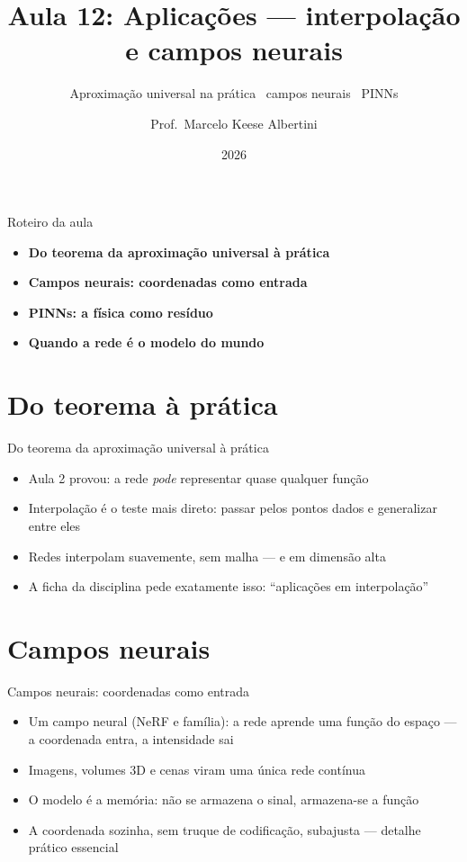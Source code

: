 \documentclass[aspectratio=169, 11pt]{beamer}
\title[Aula 12 — Interpolação]{Aula 12: Aplicações — interpolação e campos neurais}
\subtitle[GBC073 — Inteligência Computacional]{Aproximação universal na prática \textbullet\ campos neurais \textbullet\ PINNs}
\author[Prof.\ Marcelo Albertini]{Prof.\ Marcelo Keese Albertini}
\institute{GBC073 — Inteligência Computacional \textbullet\ Universidade Federal de Uberlândia}
\date{2026}
\begin{document}
\begin{frame}
  \titlepage
\end{frame}

\begin{frame}{Roteiro da aula}
  \begin{itemize}\setlength{\itemsep}{0.5ex}
    \item<1-> \textbf{Do teorema da aproximação universal à prática}
    \item<2-> \textbf{Campos neurais: coordenadas como entrada}
    \item<3-> \textbf{PINNs: a física como resíduo}
    \item<4-> \textbf{Quando a rede é o modelo do mundo}
  \end{itemize}
\end{frame}

\section{Do teorema à prática}

\begin{frame}{Do teorema da aproximação universal à prática}
  \begin{itemize}\setlength{\itemsep}{0.4ex}
    \item Aula 2 provou: a rede \emph{pode} representar quase qualquer função
    \item Interpolação é o teste mais direto: passar pelos pontos dados e
          generalizar entre eles
    \item Redes interpolam suavemente, sem malha — e em dimensão alta
    \item A ficha da disciplina pede exatamente isso: ``aplicações em
          interpolação''
  \end{itemize}
\end{frame}

\section{Campos neurais}

\begin{frame}{Campos neurais: coordenadas como entrada}
  \begin{itemize}\setlength{\itemsep}{0.4ex}
    \item Um campo neural (NeRF e família): a rede aprende uma função do
          espaço — a coordenada entra, a intensidade sai
    \item Imagens, volumes 3D e cenas viram uma única rede contínua
    \item O modelo é a memória: não se armazena o sinal, armazena-se a função
    \item A coordenada sozinha, sem truque de codificação, subajusta — detalhe
          prático essencial
  \end{itemize}
\end{frame}
\end{document}
